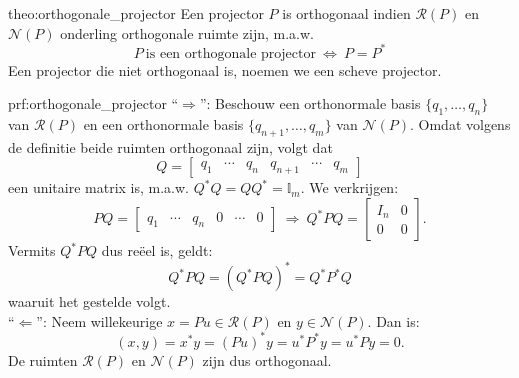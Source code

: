 \begin{theo}{theo:orthogonale_projector}
    Een projector $P$ is orthogonaal indien $\mathcal{R}(P)$ en $\mathcal{N}(P)$ onderling orthogonale ruimte zijn, m\@.a\@.w\@.
    \begin{equation*}
        P \ \text{is een orthogonale projector} \ \Leftrightarrow \ P = P^*
    \end{equation*} 
    Een projector die niet orthogonaal is, noemen we een scheve projector.
\end{theo}


\begin{prf}{prf:orthogonale_projector}
    ``$\Rightarrow$'': Beschouw een orthonormale basis $\{q_1, \ldots, q_n\}$ van $\mathcal{R}(P)$ en een orthonormale basis $\{q_{n+1}, \ldots, q_m\}$ van $\mathcal{N}(P)$. Omdat volgens de definitie beide ruimten orthogonaal zijn, volgt dat
    \begin{equation*}
        Q = \begin{bmatrix} q_1 & \cdots & q_n & q_{n+1} & \cdots & q_m \end{bmatrix}
    \end{equation*}
     een unitaire matrix is, m\@.a\@.w\@. $Q^*Q = QQ^* = \mathbb{I}_m$. We verkrijgen:
    \begin{equation*}
        PQ = \begin{bmatrix} q_1 & \cdots & q_n &0 & \cdots & 0 \end{bmatrix} \ \Rightarrow \ Q^*PQ = \begin{bmatrix} I_n & 0 \\ 0 & 0 \end{bmatrix}.
    \end{equation*}
    Vermits $Q^*PQ$ dus reëel is, geldt:
    \begin{equation*}
        Q^*PQ = (Q^*PQ)^* = Q^*P^*Q
    \end{equation*}
    waaruit het gestelde volgt. \\

    ``$\Leftarrow$'': Neem willekeurige $x = Pu \in \mathcal{R}(P)$ en $y \in \mathcal{N}(P)$. Dan is:
    \begin{equation*}
        ( x, y ) = x^*y = (Pu)^*y = u^*P^*y= u^*Py = 0.
    \end{equation*}
    De ruimten $\mathcal{R}(P)$ en $\mathcal{N}(P)$ zijn dus orthogonaal.
    \vspace{-0.3cm}
\end{prf}

